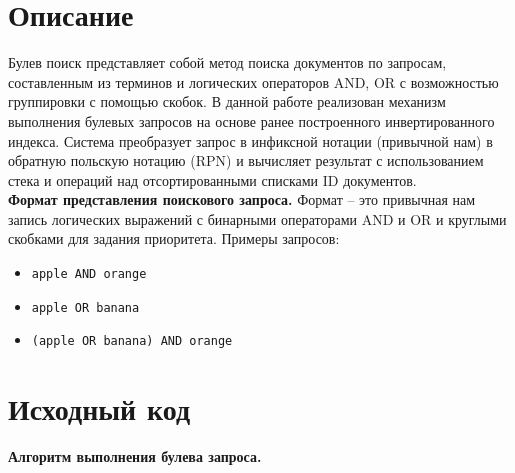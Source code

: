 \section{Описание}
Булев поиск представляет собой метод поиска документов по запросам, составленным из терминов и логических операторов AND, OR с возможностью группировки с помощью скобок. В данной работе реализован механизм выполнения булевых запросов на основе ранее построенного инвертированного индекса. Система преобразует запрос в инфиксной нотации (привычной нам) в обратную польскую нотацию (RPN) и вычисляет результат с использованием стека и операций над отсортированными списками ID документов. \\

\vspace{1 em}
\noindent\textbf{Формат представления поискового запроса.} Формат -- это привычная нам запись логических выражений с бинарными операторами AND и OR и круглыми скобками для задания приоритета. Примеры запросов:
\begin{itemize}
    \item \texttt{apple AND orange}
    \item \texttt{apple OR banana}
    \item \texttt{(apple OR banana) AND orange}
\end{itemize}
\pagebreak

\section{Исходный код}

\vspace{1 em}
\noindent\textbf{Алгоритм выполнения булева запроса.}

